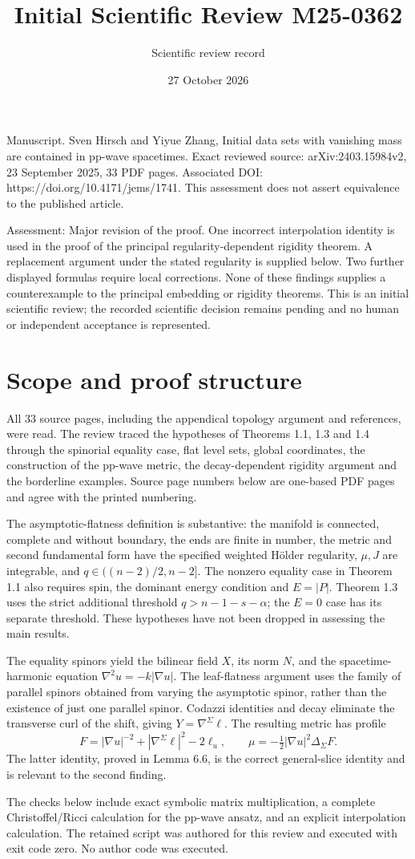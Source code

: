 \documentclass[10pt]{article}
\title{Initial Scientific Review
M25-0362}
\author{Scientific review record}
\date{27 October 2026}
\begin{document}
\maketitle
Manuscript. Sven Hirsch and Yiyue Zhang, Initial data sets with vanishing mass are contained in pp-wave spacetimes. Exact reviewed source: arXiv:2403.15984v2, 23 September 2025, 33 PDF pages. Associated DOI: https://doi.org/10.4171/jems/1741. This assessment does not assert equivalence to the published article.\par
Assessment: Major revision of the proof. One incorrect interpolation identity is used in the proof of the principal regularity-dependent rigidity theorem. A replacement argument under the stated regularity is supplied below. Two further displayed formulas require local corrections. None of these findings supplies a counterexample to the principal embedding or rigidity theorems. This is an initial scientific review; the recorded scientific decision remains pending and no human or independent acceptance is represented.\par
\section*{Scope and proof structure}
All 33 source pages, including the appendical topology argument and references, were read. The review traced the hypotheses of Theorems 1.1, 1.3 and 1.4 through the spinorial equality case, flat level sets, global coordinates, the construction of the pp-wave metric, the decay-dependent rigidity argument and the borderline examples. Source page numbers below are one-based PDF pages and agree with the printed numbering.\par
The asymptotic-flatness definition is substantive: the manifold is connected, complete and without boundary, the ends are finite in number, the metric and second fundamental form have the specified weighted Hölder regularity, \(\mu,J\) are integrable, and \(q\in((n-2)/2,n-2]\). The nonzero equality case in Theorem 1.1 also requires spin, the dominant energy condition and \(E=|P|\). Theorem 1.3 uses the strict additional threshold \(q>n-1-s-\alpha\); the \(E=0\) case has its separate threshold. These hypotheses have not been dropped in assessing the main results.\par
The equality spinors yield the bilinear field \(X\), its norm \(N\), and the spacetime-harmonic equation \(\nabla^2u=-k|\nabla u|\). The leaf-flatness argument uses the family of parallel spinors obtained from varying the asymptotic spinor, rather than the existence of just one parallel spinor. Codazzi identities and decay eliminate the transverse curl of the shift, giving \(Y=\nabla^\Sigma\ell\). The resulting metric has profile \[F=|\nabla u|^{-2}+|\nabla^\Sigma\ell|^2-2\ell_u,
 \qquad \mu=-\tfrac12|\nabla u|^2\Delta_\Sigma F.\] The latter identity, proved in Lemma 6.6, is the correct general-slice identity and is relevant to the second finding.\par
The checks below include exact symbolic matrix multiplication, a complete Christoffel/Ricci calculation for the pp-wave ansatz, and an explicit interpolation calculation. The retained script was authored for this review and executed with exit code zero. No author code was executed.\par
\end{document}
